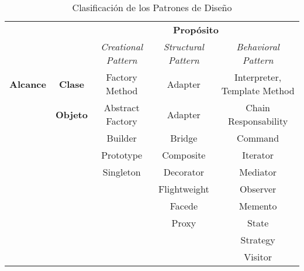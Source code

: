 \begin{center}
    \begin{table}
        \begin{tabular}{|c|c|c|c|c|}
            \cline{3-5}
            \multicolumn{1}{c}{} & \multicolumn{1}{c|}{} & \multicolumn{3}{c|}{\textbf{Propósito}}\\
            \cline{3-5}
            \multicolumn{1}{c}{} & \multicolumn{1}{c|}{} & \multicolumn{1}{c|}{\textit{Creational Pattern}} &
                                    \multicolumn{1}{c|}{\textit{Structural Pattern}} &
                                    \multicolumn{1}{c|}{\textit{Behavioral Pattern}}\\
            \hline
            \textbf{Alcance} & \textbf{Clase}  & Factory Method   & Adapter      & Interpreter, \newline Template Method \\ \cline{2-5}
                             & \textbf{Objeto} & Abstract Factory & Adapter      & Chain Responsability\\
                             &                 & Builder          & Bridge       & Command \\
                             &                 & Prototype        & Composite    & Iterator\\
                             &                 & Singleton        & Decorator    & Mediator\\
                             &                 &                  & Flightweight & Observer\\
                             &                 &                  & Facede       & Memento\\
                             &                 &                  & Proxy        & State\\
                             &                 &                  &              & Strategy\\
                             &                 &                  &              & Visitor\\
            \hline
        \end{tabular}
        \caption{Clasificación de los Patrones de Diseño}
    \end{table}
\end{center}
\noindent